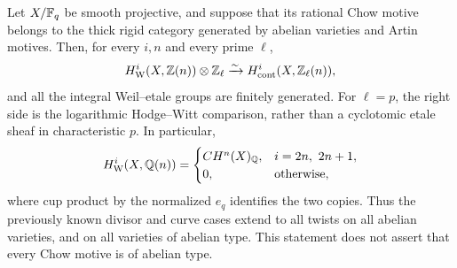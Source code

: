 \begin{theorem}
\label{thm:B-abelian-type}
Let \(X/\mathbb F_q\) be smooth projective, and suppose that its rational
Chow motive belongs to the thick rigid category generated by abelian
varieties and Artin motives.  Then, for every \(i,n\) and every prime
\(\ell\),
\[
 H^i_{\mathrm W}(X,\mathbb Z(n))\otimes\mathbb Z_\ell
 \xrightarrow{\sim}H^i_{\mathrm{cont}}(X,\mathbb Z_\ell(n)),
\]
and all the integral Weil--etale groups are finitely generated.
For \(\ell=p\), the right side is the logarithmic Hodge--Witt
comparison, rather than a cyclotomic etale sheaf in characteristic
\(p\).  In particular,
\[
 H^i_{\mathrm W}(X,\mathbb Q(n))=
 \begin{cases}
 CH^n(X)_\mathbb Q,&i=2n,\ 2n+1,\\
 0,&\text{otherwise},
 \end{cases}
\]
where cup product by the normalized \(e_q\) identifies the two
copies.  Thus the previously known divisor and curve cases extend to
all twists on all abelian varieties, and on all varieties of abelian
type.  This statement does not assert that every Chow motive is of
abelian type.
\end{theorem}
